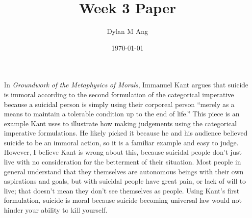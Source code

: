 \documentclass[12pt]{article}
\title{Week 3 Paper}
\author{Dylan M Ang}
\date{\today}
\begin{document}
\maketitle

In \textit{Groundwork of the Metaphysics of Morals}, Immanuel Kant argues that suicide is immoral according to the second formulation of the categorical imperative because a suicidal person is simply using their corporeal person ``merely as a means to maintain a tolerable condition up to the end of life.'' 
This piece is an example Kant uses to illustrate how making judgements using the categorical imperative formulations. He likely picked it because he and his audience believed suicide to be an immoral action, so it is a familiar example and easy to judge.
However, I believe Kant is wrong about this, because suicidal people don't just live with no consideration for the betterment of their situation. Most people in general understand that they themselves are autonomous beings with their own aspirations and goals, but with suicidal people have great pain, or lack of will to live; that doesn't mean they don't see themselves as people. Using Kant's first formulation, suicide is moral because suicide becoming universal law would not hinder your ability to kill yourself. 
\end{document}
